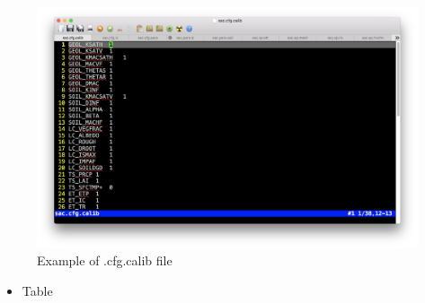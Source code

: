 \documentclass[
]{scrbook}
\providecommand{\tightlist}{%
  \setlength{\itemsep}{0pt}\setlength{\parskip}{0pt}}
\begin{document}
\begin{figure}
\centering
\includegraphics{Fig/IO/cfg.calib.png}
\caption{Example of .cfg.calib file}
\end{figure}

\begin{itemize}
\tightlist
\item
  Table
\end{itemize}
\end{document}
